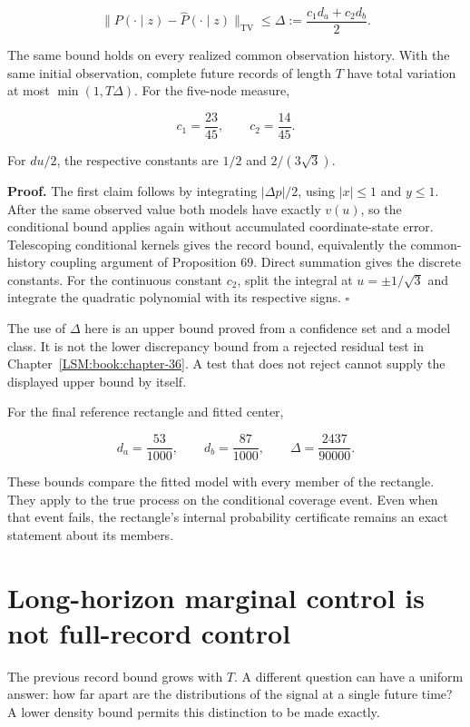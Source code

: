 \[
\boxed{
\|P(\cdot\mid z)-\widehat P(\cdot\mid z)\|_{\mathrm{TV}}
\leq\Delta:=\frac{c_1d_a+c_2d_b}{2}.
}
\]

The same bound holds on every realized common observation history. With
the same initial observation, complete future records of length \(T\)
have total variation at most \(\min(1,T\Delta)\). For the five-node
measure,

\[
c_1=\frac{23}{45},\qquad c_2=\frac{14}{45}.
\]

For \(du/2\), the respective constants are \(1/2\) and \(2/(3\sqrt3)\).

\textbf{Proof.} The first claim follows by integrating \(|\Delta p|/2\),
using \(|x|\leq1\) and \(y\leq1\). After the same observed value both
models have exactly \(v(u)\), so the conditional bound applies again
without accumulated coordinate-state error. Telescoping conditional
kernels gives the record bound, equivalently the common-history coupling
argument of Proposition 69. Direct summation gives the discrete
constants. For the continuous constant \(c_2\), split the integral at
\(u=\pm1/\sqrt3\) and integrate the quadratic polynomial with its
respective signs. \(\square\)

The use of \(\Delta\) here is an upper bound proved from a confidence
set and a model class. It is not the lower discrepancy bound from a
rejected residual test in Chapter~\ref{LSM:book:chapter-36}. A test that does not reject cannot
supply the displayed upper bound by itself.

For the final reference rectangle and fitted center,

\[
d_a=\frac{53}{1000},\qquad d_b=\frac{87}{1000},
\qquad
\boxed{\Delta=\frac{2437}{90000}.}
\]

These bounds compare the fitted model with every member of the
rectangle. They apply to the true process on the conditional coverage
event. Even when that event fails, the rectangle's internal probability
certificate remains an exact statement about its members.

\section{Long-horizon marginal control is not full-record control}\label{LSM:long-horizon-marginal-control-is-not-full-record-control}

The previous record bound grows with \(T\). A different question can
have a uniform answer: how far apart are the distributions of the signal
at a single future time? A lower density bound permits this distinction
to be made exactly.

